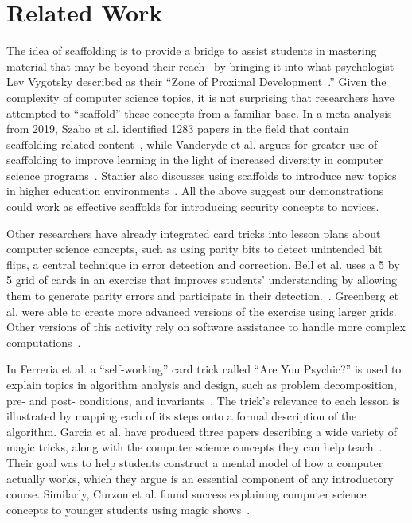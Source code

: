 \section{Related Work}
\label{SEC:related-work}

The idea of scaffolding is to provide a bridge to assist students
in mastering material that may be beyond their reach~\cite{wood1976role}
by bringing it into what psychologist Lev Vygotsky described as their
``Zone of Proximal Development~\cite{vygotsky1978}.''  Given the complexity of computer science
topics, it is not surprising that researchers have attempted to ``scaffold''
these concepts from a familiar base.  In a meta-analysis from 2019, Szabo et al.
identified 1283 papers in the field that contain scaffolding-related
content~\cite{szabometa}, while 
Vanderyde et al. argues for greater use of scaffolding to improve learning in the  light of increased diversity in computer science
programs~\cite{vanderhydescaffolding}.  Stanier also discusses
using scaffolds to introduce new topics in higher education
environments~\cite{stanierhighered}.
All the above suggest our demonstrations could work as
effective scaffolds for introducing security concepts to novices.

Other researchers have already integrated card tricks into lesson plans about
computer science concepts, such as using parity bits to detect unintended bit
flips, a central technique in error detection and correction.  Bell et al. uses a
5 by 5 grid of cards in an exercise that improves students' understanding by allowing them to generate parity errors and participate in their detection.~\cite{bell2009computer, csunplugged}.
Greenberg et
al. were able to create more advanced versions of the exercise using larger grids.  Other versions
of this activity rely on software assistance to handle more complex
computations~\cite{Greenberg2018}.

In Ferreria et al. a ``self-working'' card trick called ``Are You Psychic?''
is used
to explain topics in algorithm analysis and design, such as problem
decomposition, pre- and post- conditions, and
invariants~\cite{ferreira2014magic}.
The trick's relevance
to each lesson is illustrated by mapping each of its steps onto a formal
description of the algorithm.  Garcia et al. have produced three papers describing
a wide variety of magic tricks, along with the computer science concepts they
can help teach~\cite{garcia2016demystifying}.
Their goal was to help students construct a mental model of how
a computer actually works, which they argue is an essential component of any
introductory course.  Similarly, Curzon et al. found success explaining computer
science concepts to younger students using magic shows~\cite{curzon2008engaging}.


